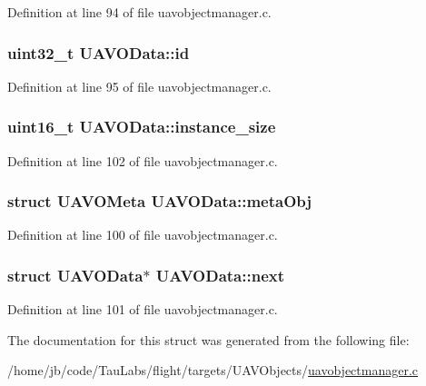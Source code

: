 \-Definition at line 94 of file uavobjectmanager.\-c.

\hypertarget{struct_u_a_v_o_data_aead38a840ec3156c37871e121c202e40}{
\subsubsection[{id}]{\setlength{\rightskip}{0pt plus 5cm}uint32\-\_\-t {\bf \-U\-A\-V\-O\-Data\-::id}}}\label{struct_u_a_v_o_data_aead38a840ec3156c37871e121c202e40}


\-Definition at line 95 of file uavobjectmanager.\-c.

\hypertarget{struct_u_a_v_o_data_a1ba7707e476478c92318fe6589e3dfd9}{
\subsubsection[{instance\-\_\-size}]{\setlength{\rightskip}{0pt plus 5cm}uint16\-\_\-t {\bf \-U\-A\-V\-O\-Data\-::instance\-\_\-size}}}\label{struct_u_a_v_o_data_a1ba7707e476478c92318fe6589e3dfd9}


\-Definition at line 102 of file uavobjectmanager.\-c.

\hypertarget{struct_u_a_v_o_data_a81dba5fc31f263dc85688f290703f9c5}{
\subsubsection[{meta\-Obj}]{\setlength{\rightskip}{0pt plus 5cm}struct {\bf \-U\-A\-V\-O\-Meta} {\bf \-U\-A\-V\-O\-Data\-::meta\-Obj}}}\label{struct_u_a_v_o_data_a81dba5fc31f263dc85688f290703f9c5}


\-Definition at line 100 of file uavobjectmanager.\-c.

\hypertarget{struct_u_a_v_o_data_a69aa4b26e0e8727f2e9a418f42d056a0}{
\subsubsection[{next}]{\setlength{\rightskip}{0pt plus 5cm}struct {\bf \-U\-A\-V\-O\-Data}$\ast$ {\bf \-U\-A\-V\-O\-Data\-::next}}}\label{struct_u_a_v_o_data_a69aa4b26e0e8727f2e9a418f42d056a0}


\-Definition at line 101 of file uavobjectmanager.\-c.



\-The documentation for this struct was generated from the following file\-:\begin{DoxyCompactItemize}
\item 
/home/jb/code/\-Tau\-Labs/flight/targets/\-U\-A\-V\-Objects/\hyperlink{uavobjectmanager_8c}{uavobjectmanager.\-c}\end{DoxyCompactItemize}
